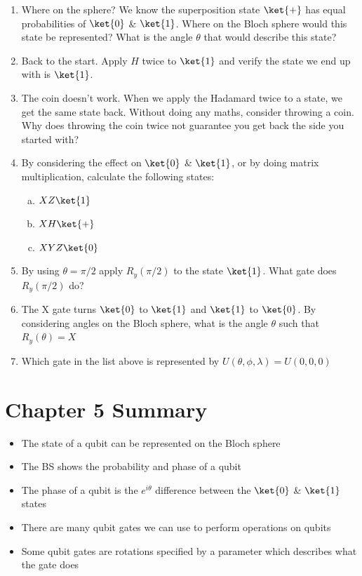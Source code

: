 \documentclass{book}
\begin{document}
\begin{enumerate}
    \item Where on the sphere? We know the superposition state $\ket{+}$ has equal probabilities of $\ket{0}$ \& $\ket{1}$. Where on the Bloch sphere would this state be represented? What is the angle $\theta$ that would describe this state?
    \item Back to the start. Apply $H$ twice to $\ket{1}$ and verify the state we end up with is $\ket{1}$. 
    \item  The coin doesn't work. When we apply the Hadamard twice to a state, we get the same state back. Without doing any maths, consider throwing a coin. Why does throwing the coin twice not guarantee you get back the side you started with? 
    \item By considering the effect on $\ket{0}$ \& $ \ket{1}$, or by doing matrix multiplication, calculate the following states:
    
    \begin{enumerate}[a.]
        \item \( XZ\ket{1} \)
        \item \( XH\ket{+} \)
        \item \( XYZ\ket{0} \)
    \end{enumerate}
    \item By using $\theta = \pi/2$ apply $R_y(\pi/2)$ to the state $\ket{1}$. What gate does $R_y(\pi/2)$ do? 
    \item The X gate turns $\ket{0}$ to $\ket{1}$ and $\ket{1}$ to $\ket{0}$. By considering angles on the Bloch sphere, what is the angle $\theta$ such that $R_y(\theta) = X$
    \item Which gate in the list above is represented by  $U(\theta, \phi, \lambda) = U(0,0,0)$ 
\end{enumerate}



\section{Chapter 5 Summary }

\begin{itemize}
    \item The state of a qubit can be represented on the Bloch sphere
    \item The BS shows the probability and phase of a qubit 
    \item The phase of a qubit is the $e^{i\theta}$ difference between the $\ket{0}$ \& $\ket{1}$ states
    \item There are many qubit gates we can use to perform operations on qubits
    \item Some qubit gates are rotations specified by a parameter which describes what the gate does
    
\end{itemize}
\end{document}
